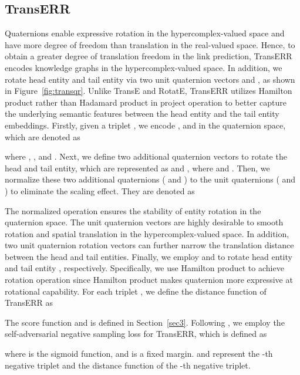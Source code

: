 \documentclass[11pt]{article}
\begin{document}
\subsection{TransERR}\label{sec4.1}
Quaternions enable expressive rotation in the hypercomplex-valued space and have more degree of freedom than translation in the real-valued space. Hence, to obtain a greater degree of translation freedom in the link prediction, TransERR encodes knowledge graphs in the hypercomplex-valued space. In addition, we rotate head entity  and tail entity  via two unit quaternion vectors  and , as shown in Figure~\ref{fig:transqr}. Unlike TransE and RotatE, TransERR utilizes Hamilton product  rather than Hadamard product  in project operation to better capture  the underlying semantic features between the head entity and the tail entity embeddings. Firstly, given a triplet , we encode ,  and  in the quaternion space, which are denoted as

where , ,  and . Next, we define two additional quaternion vectors to  rotate the head and tail entity, which are represented as  and , where  and . Then, we normalize these two additional quaternions ( and ) to the unit quaternions ( and ) to eliminate the scaling effect. They are denoted as








The normalized operation ensures the stability of entity rotation in the quaternion space. The unit quaternion vectors are highly desirable to smooth rotation and spatial translation in the hypercomplex-valued space. In addition, two unit quaternion rotation vectors can further narrow the translation distance between the head and tail entities. Finally, we employ  and  to rotate head entity  and tail entity , respectively. Specifically, we use Hamilton product to achieve rotation operation since Hamilton product makes quaternion more expressive at rotational capability. For each triplet , we define the distance function of TransERR as



The score function  and  is defined in Section~\ref{sec3}. Following \citet{31sun2019rotate}, we employ the self-adversarial negative sampling loss for TransERR, which is defined as



where  is the sigmoid function, and  is a fixed margin.  and  represent the -th negative triplet and the distance function of the -th negative triplet. 
\end{document}
